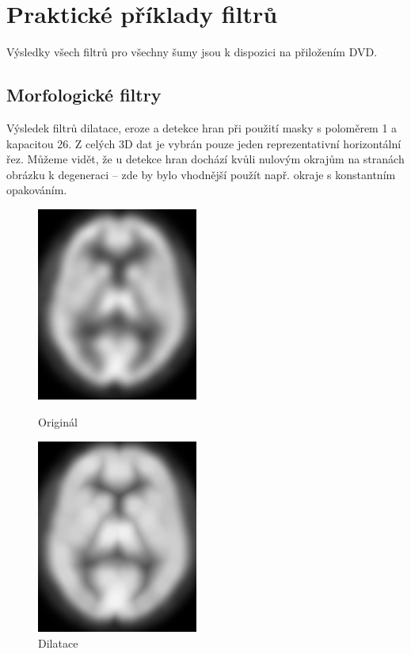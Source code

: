 \chapter{Praktické příklady filtrů}\label{příloha obrázky}

    Výsledky všech filtrů pro všechny šumy jsou k dispozici na přiložením DVD.

    \section{Morfologické filtry}

    Výsledek filtrů dilatace, eroze a detekce hran při použití masky s poloměrem 1 a kapacitou 26. Z celých 3D dat je vybrán pouze jeden reprezentativní horizontální řez. Můžeme vidět, že u detekce hran dochází kvůli nulovým okrajům na stranách obrázku k degeneraci -- zde by bylo vhodnější použít např. okraje s konstantním opakováním.
    \vfill
    \newpage
    \begin{figure}[htp]
        \begin{minipage}[l]{0.5\textwidth}
            \center
            \includegraphics[width = 150pt]{src/8Appendix/final/original.png}
            \caption{Originál}
        \end{minipage}
        \begin{minipage}[r]{0.5\textwidth}
            \center
            \includegraphics[width = 150pt]{src/8Appendix/final/dilatace.png}
            \caption{Dilatace}
        \end{minipage}
     \end{figure}
